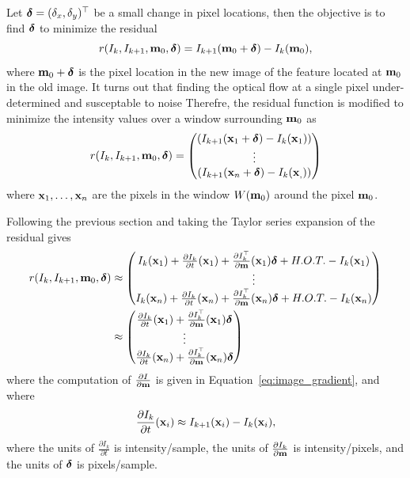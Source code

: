 Let $\boldsymbol{\delta} = (\delta_x, \delta_y)^\top$ be a small change in pixel locations, then the objective is to find $\boldsymbol{\delta}$ to minimize the residual
\begin{equation}\label{eq:optical_flow_1}
r(I_k, I_{k+1}, \mbf_0, \deltabf) = I_{k+1}(\mbf_0+\deltabf) - I_k(\mbf_0),
\end{equation}
where $\mathbf{m}_0+\boldsymbol{\delta}$ is the pixel location in the new image of the feature located at $\mathbf{m}_0$ in the old image.  It turns out that finding the optical flow at a single pixel under-determined and susceptable to noise  Therefre, the residual function is modified to minimize the intensity values over a window surrounding $\mathbf{m}_0$ as
\begin{equation}\label{eq:optical_flow_1}
r(I_k, I_{k+1}, \mbf_0, \deltabf) = \begin{pmatrix} \left(I_{k+1}(\xbf_1+\deltabf) - I_k(\xbf_1)\right) \\
\vdots \\
\left(I_{k+1}(\xbf_n+\deltabf) - I_k(\xbf_,)\right)
\end{pmatrix}
\end{equation}
where $\mathbf{x}_1, \dots, \mathbf{x}_n$ are the pixels in the window $W(\mathbf{m}_0)$ around the pixel $\mathbf{m}_0$.  


Following the previous section and taking the Taylor series expansion of the residual gives
\begin{align*}
r(I_k, I_{k+1}, \mathbf{m}_0, \boldsymbol{\delta}) &\approx \begin{pmatrix} I_k(\mathbf{x}_1) + \frac{\partial I_k}{\partial t}(\mathbf{x}_1) + \frac{\partial I_k^\top}{\partial \mathbf{m}}(\mathbf{x}_1)\boldsymbol{\delta} + H.O.T. - I_k(\mathbf{x}_1) \\
\vdots \\
I_k(\mathbf{x}_n) + \frac{\partial I_k}{\partial t}(\mathbf{x}_n) + \frac{\partial I_k^\top}{\partial \mathbf{m}}(\mathbf{x}_n)\boldsymbol{\delta} + H.O.T. - I_k(\mathbf{x}_n)
\end{pmatrix} \\
	&\approx \begin{pmatrix} \frac{\partial I_k}{\partial t}(\mathbf{x}_1) + \frac{\partial I_k^\top}{\partial \mathbf{m}}(\mathbf{x}_1)\boldsymbol{\delta} \\
	\vdots \\
	\frac{\partial I_k}{\partial t}(\mathbf{x}_n) + \frac{\partial I_k^\top}{\partial \mathbf{m}}(\mathbf{x}_n)\boldsymbol{\delta}
	\end{pmatrix}
\end{align*}
where the computation of $\frac{\partial I}{\partial \mathbf{m}}$ is given in Equation~\eqref{eq:image_gradient}, and where 
\[
\frac{\partial I_k}{\partial t}(\mathbf{x}_i) \approx I_{k+1}(\mathbf{x}_i) - I_k(\mathbf{x}_i),
\]
where the units of $\frac{\partial I_k}{\partial t}$ is intensity/sample, the units of $\frac{\partial I_k}{\partial \mathbf{m}}$ is intensity/pixels, and the units of $\boldsymbol{\delta}$ is pixels/sample.  

